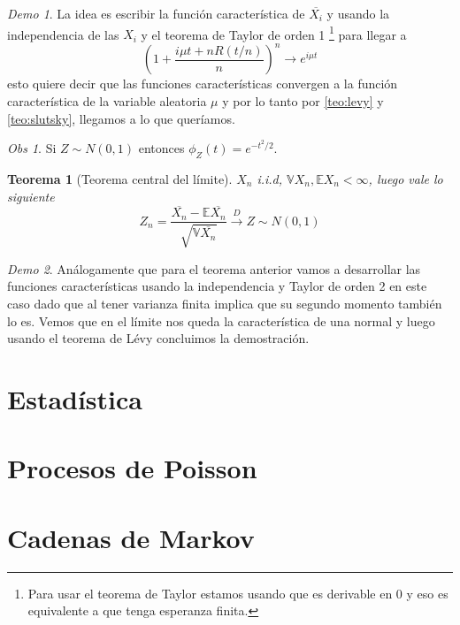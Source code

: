 \documentclass[11pt]{article}
\theoremstyle{plain} %
\newtheorem{teorema}{Teorema}
\theoremstyle{definition}
\theoremstyle{remark}
\newtheorem{obs}{Obs}
\newtheorem*{demo}{Demo}
\def\V{\mathbb{V}}
\def\E{\mathbb{E}}
\renewcommand\qed{\ding{110}}
\newcommand{\dist}{\overset{D}{\to}}
\begin{document}
\begin{demo}
	La idea es escribir la función característica de $\overline{X_i}$ y usando la independencia de las $X_i$ y el teorema de Taylor de orden 1 \footnote{Para usar el teorema de Taylor estamos usando que es derivable en 0 y eso es equivalente a que tenga esperanza finita.} para llegar a 
	\[ \left( 1+ \dfrac{i\mu t + nR(t/n)}{n} \right) ^ {n} \to e^{i\mu t}  \]
	esto quiere decir que las funciones características convergen a la función característica de la variable aleatoria $\mu$ y por lo tanto por \ref{teo:levy} y \ref{teo:slutsky}, llegamos a lo que queríamos. \qed
\end{demo}

\begin{obs}
	Si $Z \sim N(0,1)$ entonces $\phi_{Z}(t) = e^{-t^{2}/{2}}$.
\end{obs}

\begin{teorema}		
	[Teorema central del límite]
	$X_n$ i.i.d, $\V X_n, \E X_n < \infty$, luego vale lo siguiente 
	\[ Z_n = \dfrac{\overline{X_n}-\E\overline{X_n}}{\sqrt{\V \overline{X_n} }} \dist Z \sim N(0,1) \]
	 
\end{teorema}

\begin{demo}
	Análogamente que para el teorema anterior vamos a desarrollar las funciones características usando la independencia y Taylor de orden 2 en este caso dado que al tener varianza finita implica que su segundo momento también lo es. Vemos que en el límite nos queda la característica de una normal y luego usando el teorema de Lévy concluimos la demostración.
\end{demo}


\bigskip
\section{Estadística}


\bigskip
\section{Procesos de Poisson}
\bigskip
\section{Cadenas de Markov}
\end{document}
